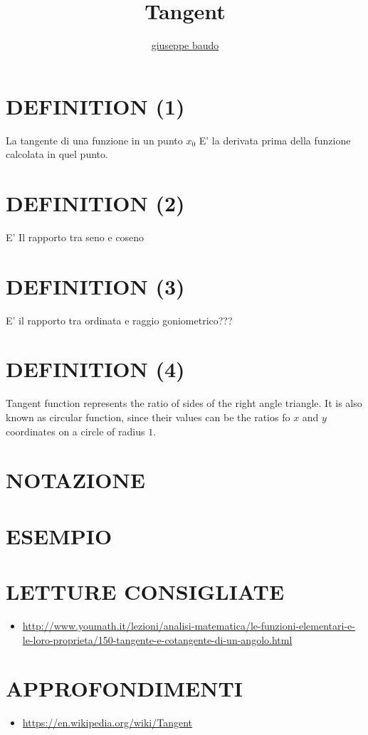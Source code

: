 \documentclass[a4paper,10pt]{article}
\title{Tangent}
\author{\href{http://www.baudo.hol.es}{giuseppe baudo}}
\begin{document}
\maketitle

\section{DEFINITION (1)}
La tangente di una funzione in un punto $x_0$ E' la derivata prima della funzione calcolata in quel punto.

\section{DEFINITION (2)}
E' Il rapporto tra seno e coseno

\section{DEFINITION (3)}
E' il rapporto tra ordinata e raggio goniometrico???

\section{DEFINITION (4)}
Tangent function represents the ratio of sides of the right angle triangle. It is also known as circular
function, since their values can be the ratios fo $x$ and $y$ coordinates on a circle of radius $1$.
\section{NOTAZIONE}

\section{ESEMPIO}

\section{LETTURE CONSIGLIATE}
\begin{itemize}
 \item \url{http://www.youmath.it/lezioni/analisi-matematica/le-funzioni-elementari-e-le-loro-proprieta/150-tangente-e-cotangente-di-un-angolo.html}
\end{itemize}

\section{APPROFONDIMENTI}
  \begin{itemize}
   \item \url{https://en.wikipedia.org/wiki/Tangent}
  \end{itemize}
\end{document}
